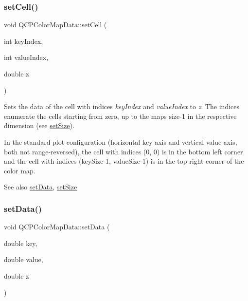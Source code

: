 \subsubsection{\texorpdfstring{set\+Cell()}{setCell()}}
{\footnotesize\ttfamily void Q\+C\+P\+Color\+Map\+Data\+::set\+Cell (\begin{DoxyParamCaption}\item[{int}]{key\+Index,  }\item[{int}]{value\+Index,  }\item[{double}]{z }\end{DoxyParamCaption})}

Sets the data of the cell with indices {\itshape key\+Index} and {\itshape value\+Index} to {\itshape z}. The indices enumerate the cells starting from zero, up to the map\textquotesingle{}s size-\/1 in the respective dimension (see \mbox{\hyperlink{class_q_c_p_color_map_data_a0d9ff35c299d0478b682bfbcdd9c097e}{set\+Size}}).

In the standard plot configuration (horizontal key axis and vertical value axis, both not range-\/reversed), the cell with indices (0, 0) is in the bottom left corner and the cell with indices (key\+Size-\/1, value\+Size-\/1) is in the top right corner of the color map.

\begin{DoxySeeAlso}{See also}
\mbox{\hyperlink{class_q_c_p_color_map_data_afd2083ccfd6987ec94aa7ef8e91ca39a}{set\+Data}}, \mbox{\hyperlink{class_q_c_p_color_map_data_a0d9ff35c299d0478b682bfbcdd9c097e}{set\+Size}} 
\end{DoxySeeAlso}
\mbox{\label{class_q_c_p_color_map_data_afd2083ccfd6987ec94aa7ef8e91ca39a}} 
\subsubsection{\texorpdfstring{set\+Data()}{setData()}}
{\footnotesize\ttfamily void Q\+C\+P\+Color\+Map\+Data\+::set\+Data (\begin{DoxyParamCaption}\item[{double}]{key,  }\item[{double}]{value,  }\item[{double}]{z }\end{DoxyParamCaption})}

